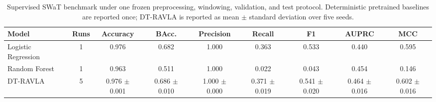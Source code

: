 \begin{table}[t]
\centering
\caption{Supervised SWaT benchmark under one frozen preprocessing, windowing, validation, and test protocol. Deterministic pretrained baselines are reported once; DT-RAVLA is reported as mean $\pm$ standard deviation over five seeds.}
\label{tab:swat_supervised_benchmark}
\renewcommand{\arraystretch}{1.12}
\setlength{\tabcolsep}{4pt}
\begin{tabular}{lcccccccc}
\hline
Model & Runs & Accuracy & BAcc. & Precision & Recall & F1 & AUPRC & MCC \\
\hline
Logistic Regression & 1 & 0.976 & 0.682 & 1.000 & 0.363 & 0.533 & 0.440 & 0.595 \\
Random Forest & 1 & 0.963 & 0.511 & 1.000 & 0.022 & 0.043 & 0.454 & 0.146 \\
DT-RAVLA & 5 & 0.976 $\pm$ 0.001 & 0.686 $\pm$ 0.010 & 1.000 $\pm$ 0.000 & 0.371 $\pm$ 0.019 & 0.541 $\pm$ 0.020 & 0.464 $\pm$ 0.016 & 0.602 $\pm$ 0.016 \\
\hline
\end{tabular}
\end{table}